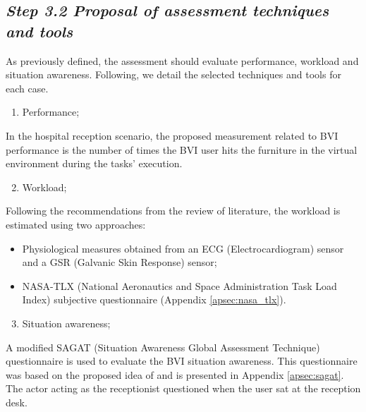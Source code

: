     \subsection*{\textit{Step 3.2 Proposal of assessment techniques and tools}}

        As previously defined, the assessment should evaluate performance, workload and situation awareness. Following, we detail the selected techniques and tools for each case.

        \begin{enumerate} [label = \Alph*)]
            \item Performance;
        \end{enumerate}
            
        In the hospital reception scenario, the proposed measurement related to BVI performance is the number of times the BVI user hits the furniture in the virtual environment during the tasks' execution.

        \begin{enumerate} [label = \Alph*)]
            \setcounter{enumi}{1}
            \item Workload;
        \end{enumerate}

        Following the recommendations from the review of literature, the workload is estimated using two approaches:
        \begin{itemize}
            \item Physiological measures obtained from an ECG (Electrocardiogram) sensor and a GSR (Galvanic Skin Response) sensor;
            \item NASA-TLX (National Aeronautics and Space Administration Task Load Index) subjective questionnaire (Appendix \ref{apsec:nasa_tlx}).           
        \end{itemize}

        \begin{enumerate} [label = \Alph*)]
            \setcounter{enumi}{2}
            \item Situation awareness;
        \end{enumerate}

        A modified SAGAT (Situation Awareness Global Assessment Technique) questionnaire is used to evaluate the BVI situation awareness. This questionnaire was based on the proposed idea of \cite{endsley1988design} and is presented in Appendix \ref{apsec:sagat}. The actor acting as the receptionist questioned when the user sat at the reception desk.


